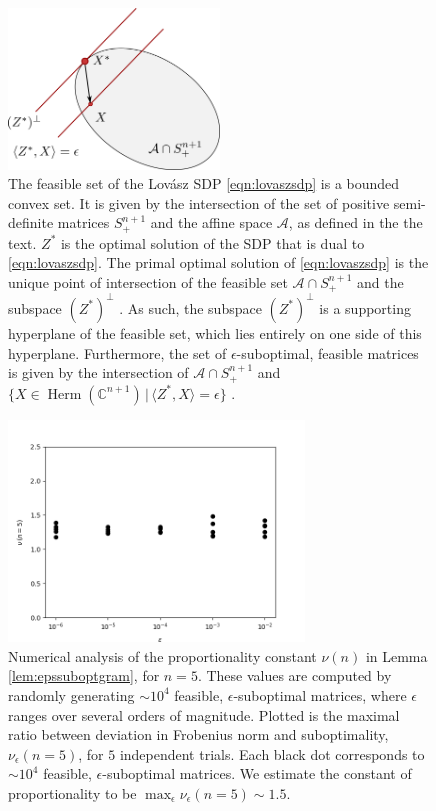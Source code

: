 \begin{figure}
\begin{center}
\includegraphics[width=0.5\textwidth]{images/feasibleset.png}
\end{center}
\caption{The feasible set of the Lovász SDP \ref{eqn:lovaszsdp} is a bounded convex set. It is given by the intersection of the set of positive semi-definite matrices $S_{+}^{n+1}$ and the affine space $\mathcal{A}$, as defined in the the text. $Z^{*}$ is the optimal solution of the SDP that is dual to \ref{eqn:lovaszsdp}. The primal optimal solution of \ref{eqn:lovaszsdp} is the unique point of intersection of the feasible set $\mathcal{A}\cap S_{+}^{n+1}$ and the subspace $(Z^{*})^{\perp}$ \cite{Bharti2019}. As such, the subspace $(Z^{*})^{\perp}$ is a supporting hyperplane of the feasible set, which lies entirely on one side of this hyperplane.  Furthermore, the set of $\epsilon$-suboptimal, feasible matrices is given by the intersection of $\mathcal{A}\cap S_{+}^{n+1}$ and $\{X\in \operatorname{Herm}(\mathbb{C}^{n+1})\,\vert\, \langle Z^{*}, X\rangle = \epsilon\}$ \cite{Bharti2019}.}
\label{fig:feasibleset}
\end{figure}

\begin{figure}
\begin{center}
\includegraphics[width=0.7\textwidth]{images/propconst.png}
\end{center}
\caption{Numerical analysis of the proportionality constant $\nu(n)$ in Lemma \ref{lem:epssuboptgram}, for $n=5$. These values are computed by randomly generating $\sim 10^4$ feasible, $\epsilon$-suboptimal matrices, where $\epsilon$ ranges over several orders of magnitude. Plotted is the maximal ratio between deviation in Frobenius norm and suboptimality, $\nu_{\epsilon}(n=5)$, for $5$ independent trials. Each black dot corresponds to $\sim 10^4$ feasible, $\epsilon$-suboptimal matrices. We estimate the constant of proportionality to be $\max_{\epsilon} \nu_{\epsilon}(n=5)\sim 1.5$.}
\label{fig:propconst}
\end{figure}

